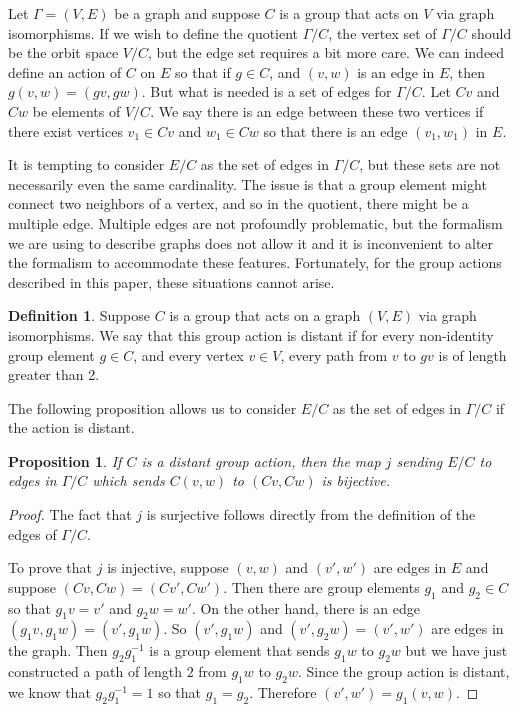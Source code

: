 \documentclass[12pt,twoside,singlespace]{article}
\numberwithin{equation}{section}
\newtheorem{prop}[equation]{Proposition}
\theoremstyle{definition}
\newtheorem{definition}[equation]{Definition}
\begin{document}
Let $\Gamma=(V,E)$ be a graph and suppose $C$ is a group that acts on $V$ via graph isomorphisms.  If we wish to define the quotient $\Gamma/C$, the vertex set of $\Gamma/C$ should be the orbit space $V/C$, but the edge set requires a bit more care.  We can indeed define an action of $C$ on $E$ so that if $g\in C$, and $(v,w)$ is an edge in $E$, then $g(v,w)=(gv,gw)$.  But what is needed is a set of edges for $\Gamma/C$.  Let $Cv$ and $Cw$ be elements of $V/C$.  We say there is an edge between these two vertices if there exist vertices $v_1\in Cv$ and $w_1\in Cw$ so that there is an edge $(v_1,w_1)$ in $E$.

It is tempting to consider $E/C$ as the set of edges in $\Gamma/C$, but these sets are not necessarily even the same cardinality.  The issue is that a group element might connect two neighbors of a vertex, and so in the quotient, there might be a multiple edge.  Multiple edges are not profoundly problematic, but the formalism we are using to describe graphs does not allow it and it is inconvenient to alter the formalism to accommodate these features.  Fortunately, for the group actions described in this paper, these situations cannot arise.

\begin{definition}
Suppose $C$ is a group that acts on a graph $(V,E)$ via graph isomorphisms.  We say that this group action is distant if for every non-identity group element $g\in C$, and every vertex $v\in V$, every path from $v$ to $gv$ is of length greater than 2.
\end{definition}

The following proposition allows us to consider $E/C$ as the set of edges in $\Gamma/C$ if the action is distant.

\begin{prop}
\label{prop:distiso}
If $C$ is a distant group action, then the map $j$ sending $E/C$ to edges in $\Gamma/C$ which sends $C(v,w)$ to $(Cv,Cw)$ is bijective.
\end{prop}
\begin{proof}
The fact that $j$ is surjective follows directly from the definition of the edges of $\Gamma/C$.

To prove that $j$ is injective, suppose $(v,w)$ and $(v',w')$ are edges in $E$ and suppose $(Cv,Cw)=(Cv',Cw')$.  Then there are group elements $g_1$ and $g_2\in C$ so that $g_1v=v'$ and $g_2w=w'$.  On the other hand, there is an edge $(g_1v,g_1w)=(v',g_1w)$.  So $(v',g_1w)$ and $(v',g_2w)=(v',w')$ are edges in the graph.  Then $g_2g_1^{-1}$ is a group element that sends $g_1w$ to $g_2w$ but we have just constructed a path of length $2$ from $g_1w$ to $g_2w$.  Since the group action is distant, we know that $g_2g_1^{-1}=1$ so that $g_1=g_2$.  Therefore $(v',w')=g_1(v,w)$.
\end{proof}
\end{document}

